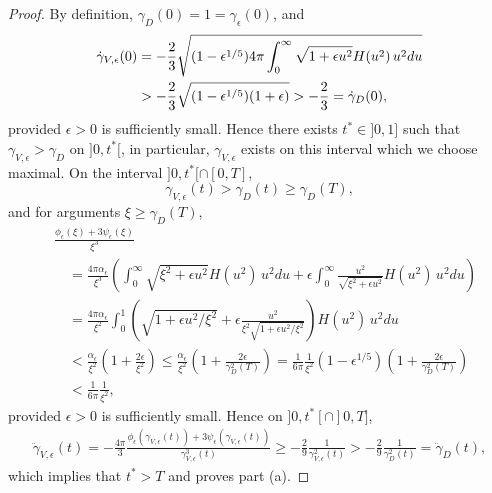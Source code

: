 \documentclass[11pt]{article}
\begin{document}
%
\begin{proof}
  By definition, $\gamma_D(0) = 1 = \gamma_\epsilon(0)$, and
  \begin{align}\label{gammadot0}
    \dot\gamma_{V,\epsilon}(0)
    &=
    - \frac{2}{3}\sqrt{(1 - \epsilon^{1/5})
    4\pi \int_0^\infty \sqrt{1 + \epsilon u^2} H(u^2)\, u^2 du}\notag\\
    &>
    - \frac{2}{3} \sqrt{(1 - \epsilon^{1/5}) (1 + \epsilon)}
    >
    - \frac{2}{3} = \dot\gamma_D(0),
  \end{align}
  provided  $\epsilon>0$ is sufficiently small.
  Hence there exists $t^\ast \in ]0,1]$ such that
  $\gamma_{V,\epsilon} > \gamma_D$ on $]0,t^\ast[$, in particular,
  $\gamma_{V,\epsilon}$ exists on this interval which we choose maximal.
  On the interval $]0,t^\ast[ \cap [0,T]$,
  \[
  \gamma_{V,\epsilon} (t) > \gamma_D(t) \geq \gamma_D(T),
  \]
  and for arguments $\xi \geq \gamma_D(T)$,
  \begin{align*}    
    &
    \frac{\phi_{\epsilon}(\xi) +
      3 \psi_{\epsilon}(\xi)}{\xi^3}\\
    &\quad =
    \frac{4\pi \alpha_\epsilon}{\xi^3}
    \left(\int_0^\infty \sqrt{\xi^2 + \epsilon u^2} H(u^2)\, u^2 du
    + \epsilon
    \int_0^\infty\frac{u^2}{\sqrt{\xi^2 + \epsilon u^2}} H(u^2)\, u^2 du
    \right) \\
    &\quad =
    \frac{4\pi \alpha_\epsilon}{\xi^2}
    \int_0^1\left(\sqrt{1 + \epsilon u^2/\xi^2}+\epsilon
    \frac{u^2}{\xi^2\sqrt{1 + \epsilon u^2/\xi^2}}\right) H(u^2)\, u^2 du\\
    &\quad <
    \frac{\alpha_\epsilon}{\xi^2}
    \left(1 + \frac{2 \epsilon}{\xi^2}\right)
    \leq
    \frac{\alpha_\epsilon}{\xi^2}
    \left(1 + \frac{2 \epsilon}{\gamma_D ^2(T)}\right)
    =
    \frac{1}{6\pi} \frac{1}{\xi^2}
    (1 - \epsilon^{1/5})\left(1 + \frac{2 \epsilon}{\gamma_D ^2(T)}\right)\\
    &\quad <
    \frac{1}{6\pi} \frac{1}{\xi^2},
  \end{align*}
  provided $\epsilon>0$ is sufficiently small.
  Hence on $]0,t^\ast[ \cap ]0,T]$,
  \begin{align}\label{ddotgamma}
  \ddot\gamma_{V,\epsilon}(t)
  = -\frac{4\pi}{3}\frac{\phi_{\epsilon}(\gamma_{V,\epsilon}(t)) +
    3 \psi_{\epsilon}(\gamma_{V,\epsilon}(t))}{\gamma^3_{V,\epsilon}(t)}
  \geq -\frac{2}{9} \frac{1}{\gamma^2_{V,\epsilon}(t)}
  > -\frac{2}{9} \frac{1}{\gamma^2_D(t)} = \ddot\gamma_D(t),
  \end{align}
  which implies that $t^\ast > T$ and proves part (a).


\end{proof}
\end{document}
